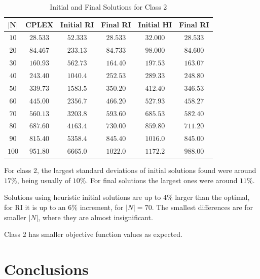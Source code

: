 \documentclass[a4paper,12pt]{article}
\begin{document}
	\begin{table}[H]
		\centering
		\begin{tabular}{c|c|c|c|c|c}
			$ \mathbf{|N|}$	& \textbf{CPLEX}& \textbf{Initial RI}   & \textbf{Final RI}	& \textbf{Initial HI} 	& \textbf{Final RI} \\ \hline
			$ 10  $			& $ 28.533 $ 	& $ 52.333 $ 			& $ 28.533 $  		& $ 32.000 $ 			& $ 28.533 $		\\ \hline
			$ 20  $			& $ 84.467 $ 	& $ 233.13 $ 			& $ 84.733 $  		& $ 98.000 $ 			& $ 84.600$	\\ \hline
			$ 30  $			& $ 160.93 $ 	& $ 562.73 $ 			& $ 164.40 $  		& $ 197.53 $ 			& $ 163.07 $ 		\\ \hline
			$ 40  $			& $ 243.40 $ 	& $ 1040.4 $ 			& $ 252.53 $  		& $ 289.33 $ 			& $ 248.80 $ 		\\ \hline
			$ 50  $			& $ 339.73 $ 	& $ 1583.5 $ 			& $ 350.20 $		& $ 412.40 $ 			& $ 346.53 $ 		\\ \hline
			$ 60  $			& $ 445.00 $ 	& $ 2356.7 $ 			& $ 466.20$  		& $ 527.93 $ 			& $ 458.27 $	 	\\ \hline
			$ 70 $			& $ 560.13 $ 	& $ 3203.8 $ 			& $ 593.60 $  		& $ 685.53 $ 			& $ 582.40 $ 		\\ \hline
			$ 80 $			& $ 687.60 $ 	& $ 4163.4 $ 			& $ 730.00 $  		& $ 859.80 $ 			& $ 711.20 $ 		\\ \hline
			$ 90 $			& $ 815.40 $ 	& $ 5358.4 $ 			& $ 845.40 $  		& $ 1016.0 $ 			& $ 845.00 $ 		\\ \hline
			$ 100 $			& $ 951.80 $ 	& $ 6665.0 $ 			& $ 1022.0 $  		& $ 1172.2 $ 			& $ 988.00 $ 		\\
		\end{tabular}
		\caption{Initial and Final Solutions for Class 2}
		\label{table:sols2}
	\end{table}
	For class 2,  the largest standard deviations of initial solutions found were around $17\%$, being usually of $10\%$.
	For final solutions the largest ones were around $11\%$.
	
	Solutions using heuristic initial solutions are up to $4\%$ larger than the optimal, for RI it is up to an $6\%$ increment, for $|N| = 70$.
	The smallest differences are for smaller $ |N| $, where they are almost insignificant.

	Class 2 has smaller objective function values as expected.
	
	\section{Conclusions}
	
\end{document}
